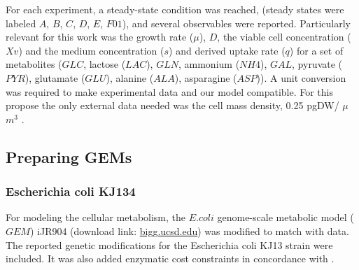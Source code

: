 \documentclass[]{article}
\begin{document}
	For each experiment, a steady-state condition was reached, (steady states were labeled 
	$A$, $B$, $C$, $D$, $E$, $F01$), and several observables were reported. Particularly 
	relevant for this work was the growth rate ($\mu$), $D$, the viable cell concentration 
	($Xv$) and the medium concentration ($s$) and derived uptake rate ($q$) for a set of 
	metabolites ($GLC$, lactose ($LAC$), $GLN$, ammonium ($NH4$), $GAL$, pyruvate ($PYR$), 
	glutamate ($GLU$), alanine ($ALA$), asparagine ($ASP$)). A unit conversion was required 
	to make experimental data and our model compatible. For this propose the only external data 
	needed was the cell mass density, 0.25 pgDW/ $\mu$$m^3$ 
	\cite{niklasQuantitativeCharacterizationMetabolism2011}.
	
	
	\subsection{Preparing GEMs} 
	
	\subsubsection{Escherichia coli KJ134}
	For modeling the cellular metabolism, the $E. coli$ genome-scale metabolic model ($GEM$) iJR904
	(download link: \href{http://bigg.ucsd.edu/static/models/iJR904.mat}{bigg.ucsd.edu})
	\cite{reedExpandedGenomescaleModel2003} 
	was modified to match with \cite{vanheerdenContinuousBatchCultures2013} data. The reported genetic 
	modifications for the Escherichia coli KJ13 strain were included. It was also added enzymatic cost 
	constraints in concordance with \cite{begIntracellularCrowdingDefines2007}.
	
\end{document}

